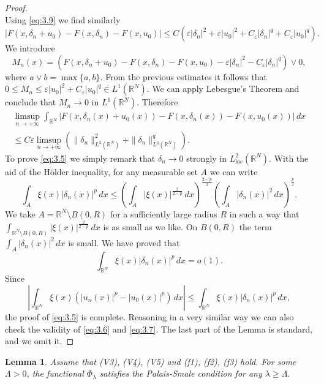 \documentclass[11pt]{amsart}
\numberwithin{equation}{section}
\newtheorem{lemma}[theorem]{Lemma}
\theoremstyle{remark}
\theoremstyle{definition}
\begin{document}
\begin{proof}
\begin{equation*}
\end{equation*}
Using \eqref{eq:3.9} we find similarly
\begin{equation*}
\left| F(x,\delta_n + u_0) -F(x,\delta_n) - F(x,u_0) \right| \leqslant 
C \left( \varepsilon |\delta_n|^2 + \varepsilon |u_0|^2   +C_\varepsilon |\delta_n|^{q}  + C_\varepsilon |u_0|^{q}  \right).
\end{equation*}
We introduce
\[
M_n(x) = \left( F(x,\delta_n + u_0) -F(x,\delta_n) - F(x,u_0) -\varepsilon |\delta_n|^2 -C_\varepsilon |\delta_n|^{q}  \right) \lor 0,
\]
where $a \lor b = \max\{a,b\}$. From the previous estimates it follows that $0 \leq M_n \leq \varepsilon |u_0|^2 + C_\varepsilon |u_0|^{q} \in L^1(\mathbb{R}^N)$. We can apply Lebesgue's Theorem and conclude that $M_n \to 0$ in $L^1(\mathbb{R}^N)$. Therefore
\begin{multline*}
\limsup_{n \to +\infty} \int_{\mathbb{R}^N}\left| F(x,\delta_n(x) + u_0(x)) -F(x,\delta_n(x)) - F(x,u_0(x)) \right| \, dx \\
 \leqslant C \varepsilon \limsup_{n \to +\infty} \left( \|\delta_n\|_{L^2(\mathbb{R}^N)}^2 + \|\delta_n\|_{L^q(\mathbb{R}^N)}^q \right).
\end{multline*}
To prove \eqref{eq:3.5} we simply remark that $\delta_n \to 0$ strongly in $L_{\mathrm{loc}}^2(\mathbb{R}^N)$. With the aid of the H\"{o}lder inequality, for any measurable set $A$ we can write
\begin{equation*}
\int_A \xi(x) | \delta_n(x) |^p \, dx \leqslant \left(\int_A | \xi(x) |^{\frac{2}{2-p}} \, dx \right)^{\frac{2-p}{2}}
\left( \int_A |\delta_n(x)|^2 \, dx 
\right)^{\frac{p}{2}}.
\end{equation*}
We take $A=\mathbb{R}^N \setminus B(0,R)$ for a sufficiently large radius $R$ in such a way that $\int_{\mathbb{R}^N\setminus B(0,R)} | \xi(x) |^{\frac{2}{2-p}} \, dx$ is as small as we like. On $B(0,R)$ the term $\int_A |\delta_n(x)|^2 \, dx$ is small. We have proved that
\[
\int_{\mathbb{R}^N} \xi(x) |\delta_n(x)|^p \, dx =o(1).
\]
Since
\[
\left| \int_{\mathbb{R}^N} \xi(x) \left( |u_n(x)|^p - |u_0(x)|^p \right) \, dx \right|  \leqslant \int_{\mathbb{R}^N} \xi(x) |\delta_n(x)|^p \, dx,
\]
the proof of \eqref{eq:3.5} is complete. Reasoning in a very similar way we can also check the validity of \eqref{eq:3.6} and \eqref{eq:3.7}.
The last part of the Lemma is standard, and we omit it.
\end{proof}
\begin{lemma} \label{lem:3.5}
	Assume that (V3), (V4), (V5) and (f1), (f2), (f3) hold. For some $\Lambda>0$, the functional $\Phi_\lambda$ satisfies the Palais-Smale condition for any $\lambda \geqslant \Lambda$. 
\end{lemma}
\end{document}

